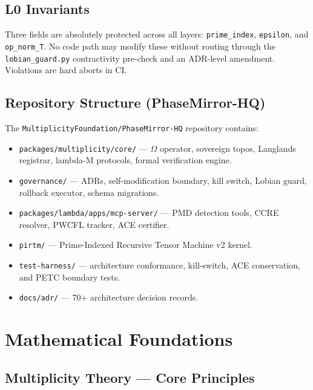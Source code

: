 \documentclass[12pt,a4paper]{article}
\theoremstyle{definition}
\theoremstyle{plain}
\theoremstyle{remark}
\begin{document}
\subsection{L0 Invariants}

\begin{alertbox}
Three fields are absolutely protected across all layers: \texttt{prime\_index},
\texttt{epsilon}, and \texttt{op\_norm\_T}. No code path may modify these
without routing through the \texttt{lobian\_guard.py} contractivity pre-check
and an ADR-level amendment. Violations are hard aborts in CI.
\end{alertbox}

\subsection{Repository Structure (PhaseMirror-HQ)}

The \texttt{MultiplicityFoundation/PhaseMirror-HQ} repository contains:
\begin{itemize}
  \item \texttt{packages/multiplicity/core/} --- $\Omega$ operator, sovereign
    topos, Langlands registrar, lambda-M protocols, formal verification engine.
  \item \texttt{governance/} --- ADRs, self-modification boundary, kill switch,
    Lobian guard, rollback executor, schema migrations.
  \item \texttt{packages/lambda/apps/mcp-server/} --- PMD detection tools,
    CCRE resolver, PWCFL tracker, ACE certifier.
  \item \texttt{pirtm/} --- Prime-Indexed Recursive Tensor Machine v2 kernel.
  \item \texttt{test-harness/} --- architecture conformance, kill-switch,
    ACE conservation, and PETC boundary tests.
  \item \texttt{docs/adr/} --- 70+ architecture decision records.
\end{itemize}

\newpage

\section{Mathematical Foundations}
\label{sec:math}

\subsection{Multiplicity Theory --- Core Principles}
\end{document}

